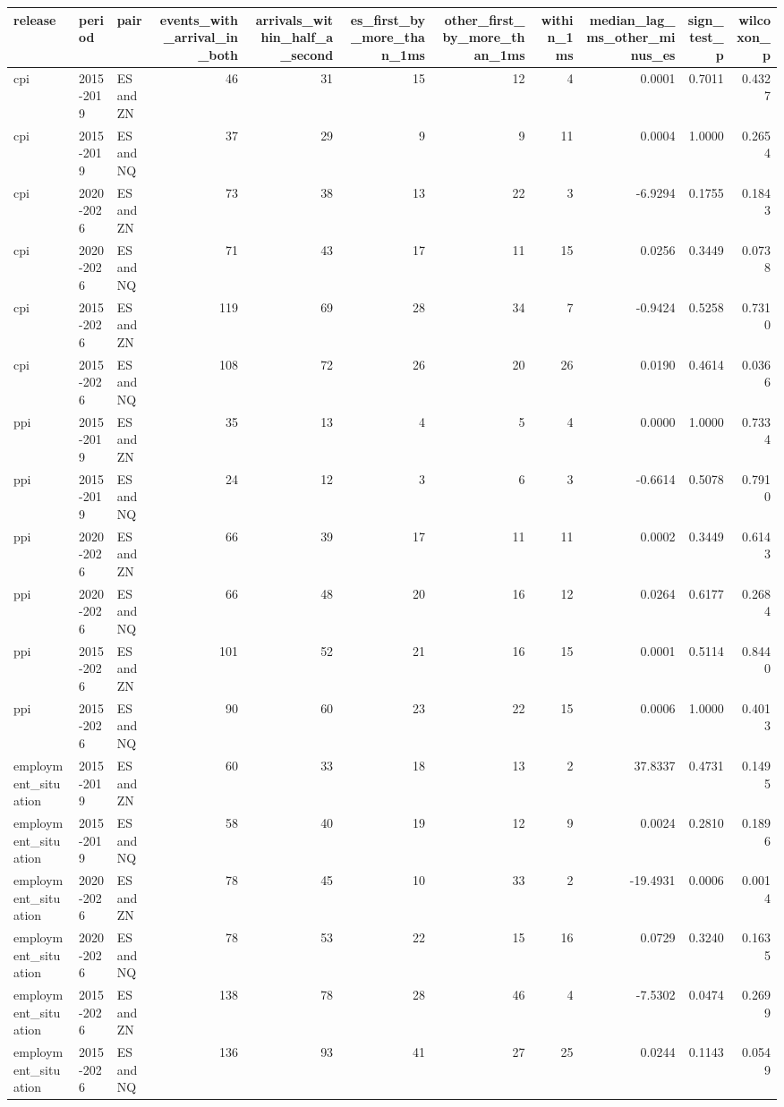 \begin{tabular}{lllrrrrrrrr}
\toprule
release & period & pair & events_with_arrival_in_both & arrivals_within_half_a_second & es_first_by_more_than_1ms & other_first_by_more_than_1ms & within_1ms & median_lag_ms_other_minus_es & sign_test_p & wilcoxon_p \\
\midrule
cpi & 2015-2019 & ES and ZN & 46 & 31 & 15 & 12 & 4 & 0.0001 & 0.7011 & 0.4327 \\
cpi & 2015-2019 & ES and NQ & 37 & 29 & 9 & 9 & 11 & 0.0004 & 1.0000 & 0.2654 \\
cpi & 2020-2026 & ES and ZN & 73 & 38 & 13 & 22 & 3 & -6.9294 & 0.1755 & 0.1843 \\
cpi & 2020-2026 & ES and NQ & 71 & 43 & 17 & 11 & 15 & 0.0256 & 0.3449 & 0.0738 \\
cpi & 2015-2026 & ES and ZN & 119 & 69 & 28 & 34 & 7 & -0.9424 & 0.5258 & 0.7310 \\
cpi & 2015-2026 & ES and NQ & 108 & 72 & 26 & 20 & 26 & 0.0190 & 0.4614 & 0.0366 \\
ppi & 2015-2019 & ES and ZN & 35 & 13 & 4 & 5 & 4 & 0.0000 & 1.0000 & 0.7334 \\
ppi & 2015-2019 & ES and NQ & 24 & 12 & 3 & 6 & 3 & -0.6614 & 0.5078 & 0.7910 \\
ppi & 2020-2026 & ES and ZN & 66 & 39 & 17 & 11 & 11 & 0.0002 & 0.3449 & 0.6143 \\
ppi & 2020-2026 & ES and NQ & 66 & 48 & 20 & 16 & 12 & 0.0264 & 0.6177 & 0.2684 \\
ppi & 2015-2026 & ES and ZN & 101 & 52 & 21 & 16 & 15 & 0.0001 & 0.5114 & 0.8440 \\
ppi & 2015-2026 & ES and NQ & 90 & 60 & 23 & 22 & 15 & 0.0006 & 1.0000 & 0.4013 \\
employment_situation & 2015-2019 & ES and ZN & 60 & 33 & 18 & 13 & 2 & 37.8337 & 0.4731 & 0.1495 \\
employment_situation & 2015-2019 & ES and NQ & 58 & 40 & 19 & 12 & 9 & 0.0024 & 0.2810 & 0.1896 \\
employment_situation & 2020-2026 & ES and ZN & 78 & 45 & 10 & 33 & 2 & -19.4931 & 0.0006 & 0.0014 \\
employment_situation & 2020-2026 & ES and NQ & 78 & 53 & 22 & 15 & 16 & 0.0729 & 0.3240 & 0.1635 \\
employment_situation & 2015-2026 & ES and ZN & 138 & 78 & 28 & 46 & 4 & -7.5302 & 0.0474 & 0.2699 \\
employment_situation & 2015-2026 & ES and NQ & 136 & 93 & 41 & 27 & 25 & 0.0244 & 0.1143 & 0.0549 \\

\end{tabular}
